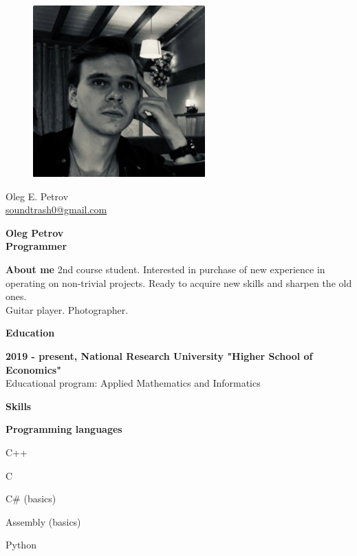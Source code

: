 \documentclass[a4paper,12pt,final]{memoir}
\newcommand{\Sep}{\vspace{1.5em}}
\newcommand{\SmallSep}{\vspace{0.5em}}
\newenvironment{AboutMe}
	{\ignorespaces\textbf{\color{RoyalBlue} About me}}
	{\Sep\ignorespacesafterend}
\newcommand{\CVSection}[1]
	{\Large\textbf{#1}\par
	\SmallSep\normalsize\normalfont}
\newcommand{\CVItem}[1]
	{\textbf{\color{RoyalBlue} #1}}
\begin{document}
%
\begin{figure}
	\hfill
	\includegraphics[width=0.6\columnwidth]{poe.png}
	\vspace{-7cm}
\end{figure}

\begin{flushright}\small
	Oleg E. Petrov \\
	\url{soundtrash0@gmail.com}
\end{flushright}\normalsize
\framebreak


\Huge\bfseries {\color{RoyalBlue} Oleg Petrov} \\
\Large\bfseries  Programmer \\

\normalsize\normalfont

\begin{AboutMe} 2nd course student. Interested in purchase of new experience in operating on non-trivial projects. Ready to acquire new skills and sharpen the old ones.\\
Guitar player. Photographer.

\end{AboutMe}

\CVSection{Education}
\CVItem{2019 - present, National Research University "Higher School of Economics"}\\
Educational program: Applied Mathematics and Informatics
\Sep

\CVSection{Skills}
\CVItem{Programming languages}
\begin{multicols}{3}
\begin{compactitem}[\color{RoyalBlue}$\circ$]
	\item C++
	\item C
	\item C\# (basics)
	\item Assembly (basics)
	\item Python
\end{compactitem}
\end{multicols}
\SmallSep
\end{document}
